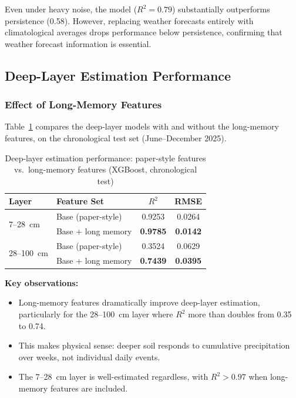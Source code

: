 \documentclass[12pt, a4paper]{article}
\begin{document}
Even under heavy noise, the model ($R^2 = 0.79$) substantially outperforms persistence (0.58). However, replacing weather forecasts entirely with climatological averages drops performance below persistence, confirming that weather forecast information is essential.

\subsection{Deep-Layer Estimation Performance}

\subsubsection{Effect of Long-Memory Features}

Table~\ref{tab:deep_layer} compares the deep-layer models with and without the long-memory features, on the chronological test set (June--December 2025).

\begin{table}[H]
\centering
\caption{Deep-layer estimation performance: paper-style features vs.\ long-memory features (XGBoost, chronological test)}
\label{tab:deep_layer}
\begin{tabular}{llcc}
\toprule
\textbf{Layer} & \textbf{Feature Set} & \textbf{$R^2$} & \textbf{RMSE} \\
\midrule
\multirow{2}{*}{7--28~cm} & Base (paper-style) & 0.9253 & 0.0264 \\
                          & Base + long memory  & \textbf{0.9785} & \textbf{0.0142} \\
\midrule
\multirow{2}{*}{28--100~cm} & Base (paper-style) & 0.3524 & 0.0629 \\
                            & Base + long memory  & \textbf{0.7439} & \textbf{0.0395} \\
\bottomrule
\end{tabular}
\end{table}

\textbf{Key observations:}
\begin{itemize}
    \item Long-memory features dramatically improve deep-layer estimation, particularly for the 28--100~cm layer where $R^2$ more than doubles from 0.35 to 0.74.
    \item This makes physical sense: deeper soil responds to cumulative precipitation over weeks, not individual daily events.
    \item The 7--28~cm layer is well-estimated regardless, with $R^2 > 0.97$ when long-memory features are included.
\end{itemize}
\end{document}
